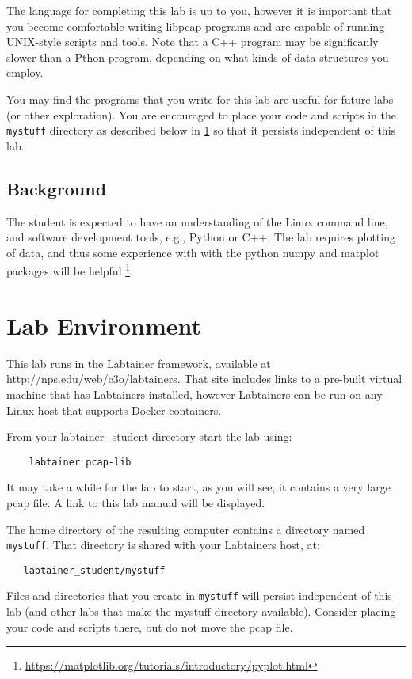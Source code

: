 The language for completing this lab is up to you, however it is important that you become comfortable writing libpcap programs and are capable of running UNIX-style scripts and tools.  Note that a C++ program may be significanly slower
than a Pthon program, depending on what kinds of data structures you employ.

You may find the programs that you write for this lab are useful for future labs (or other exploration).  You are encouraged to place your code and scripts
in the {\tt mystuff} directory as described below in \ref{environment} so that it persists independent of this lab.

\subsection {Background}
The student is expected to have an understanding of the Linux command line, and software development tools, e.g., Python or C++.
The lab requires plotting of data, and thus some experience with with the python numpy and matplot packages will be helpful \footnote{\url{https://matplotlib.org/tutorials/introductory/pyplot.html}}.

\section{Lab Environment}
\label{environment}
This lab runs in the Labtainer framework,
available at http://nps.edu/web/c3o/labtainers.
That site includes links to a pre-built virtual machine
that has Labtainers installed, however Labtainers can
be run on any Linux host that supports Docker containers.

From your labtainer_student directory start the lab using:
\begin{verbatim}
    labtainer pcap-lib
\end{verbatim}
\noindent It may take a while for the lab to start, as you will see, it contains a very large pcap file. 
A link to this lab manual will be displayed.  

The home directory of the resulting computer contains a directory named {\tt mystuff}.  That directory is shared with your Labtainers host,
at:
\begin{verbatim}
   labtainer_student/mystuff
\end{verbatim}
\noindent Files and directories that you create in {\tt mystuff} will persist independent of this lab (and other labs that make the mystuff
directory available).  Consider placing your code and scripts there, but do not move the pcap file.

